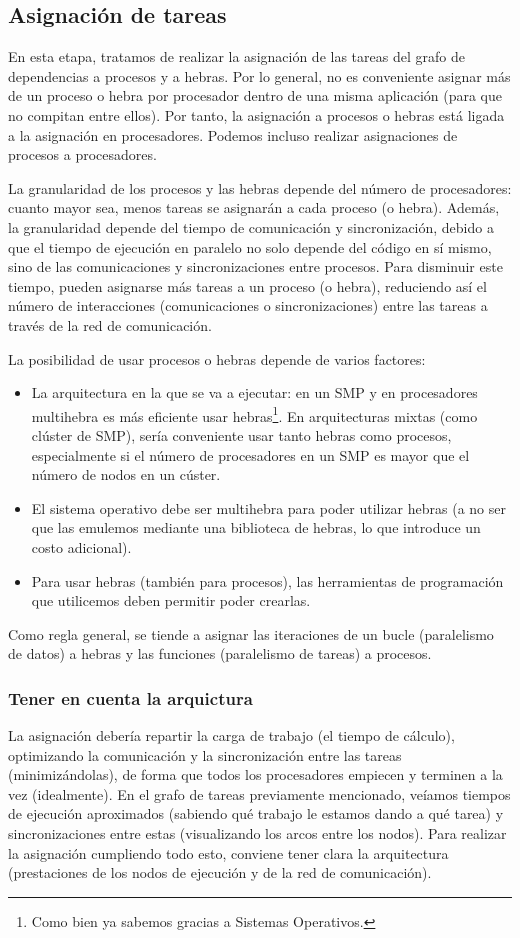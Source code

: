 \subsection{Asignación de tareas} 
En esta etapa, tratamos de realizar la asignación de las tareas del grafo de dependencias a procesos y a hebras. Por lo general, no es conveniente asignar más de un proceso o hebra por procesador dentro de una misma aplicación (para que no compitan entre ellos). Por tanto, la asignación a procesos o hebras está ligada a la asignación en procesadores. Podemos incluso realizar asignaciones de procesos a procesadores. 

La granularidad de los procesos y las hebras depende del número de procesadores: cuanto mayor sea, menos tareas se asignarán a cada proceso (o hebra). Además, la granularidad depende del tiempo de comunicación y sincronización, debido a que el tiempo de ejecución en paralelo no solo depende del código en sí mismo, sino de las comunicaciones y sincronizaciones entre procesos. Para disminuir este tiempo, pueden asignarse más tareas a un proceso (o hebra), reduciendo así el número de interacciones (comunicaciones o sincronizaciones) entre las tareas a través de la red de comunicación. 

La posibilidad de usar procesos o hebras depende de varios factores:
\begin{itemize}
    \item La arquitectura en la que se va a ejecutar: en un SMP y en procesadores multihebra es más eficiente usar hebras\footnote{Como bien ya sabemos gracias a Sistemas Operativos.}. En arquitecturas mixtas (como clúster de SMP), sería conveniente usar tanto hebras como procesos, especialmente si el número de procesadores en un SMP es mayor que el número de nodos en un cúster.
    \item El sistema operativo debe ser multihebra para poder utilizar hebras (a no ser que las emulemos mediante una biblioteca de hebras, lo que introduce un costo adicional).
    \item Para usar hebras (también para procesos), las herramientas de programación que utilicemos deben permitir poder crearlas.
\end{itemize}
Como regla general, se tiende a asignar las iteraciones de un bucle (paralelismo de datos) a hebras y las funciones (paralelismo de tareas) a procesos.

\subsubsection{Tener en cuenta la arquictura}
La asignación debería repartir la carga de trabajo (el tiempo de cálculo), optimizando la comunicación y la sincronización entre las tareas (minimizándolas), de forma que todos los procesadores empiecen y terminen a la vez (idealmente). En el grafo de tareas previamente mencionado, veíamos tiempos de ejecución aproximados (sabiendo qué trabajo le estamos dando a qué tarea) y sincronizaciones entre estas (visualizando los arcos entre los nodos). Para realizar la asignación cumpliendo todo esto, conviene tener clara la arquitectura (prestaciones de los nodos de ejecución y de la red de comunicación).

